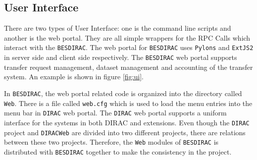 \subsection{User Interface}
There are two types of User Interface: one is the command line scripts and 
another is the web portal. 
They are all simple wrappers for the RPC Calls which interact
with the {\tt BESDIRAC}.
The web portal for {\tt BESDIRAC} uses {\tt Pylons} and {\tt ExtJS2} 
in server side and
client side respectively\cite{bib:webportal}. The {\tt BESDIRAC} web portal supports
transfer request management, dataset management and  
accounting of the transfer system. An example is shown in figure
\ref{fig:ui}.

In {\tt BESDIRAC}, the web portal related code is organized into the
directory called {\tt Web}. There is a file called \verb"web.cfg"
which is used to load the menu entries into the menu bar in {\tt DIRAC} 
web portal. The {\tt DIRAC} web portal supports a uniform interface for
the systems in both DIRAC and extensions.
Even though the {\tt DIRAC} project and {\tt DIRACWeb} are divided into
two different projects, there are relations between these two projects. 
Therefore, the {\tt Web} modules of {\tt BESDIRAC} is distributed 
with {\tt BESDIRAC} together to make the consistency in the project. 


